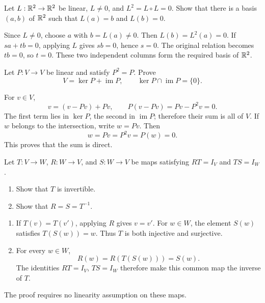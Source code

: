 \begin{problem}\label{ex:04:square-zero-map}
Let \(L:\mathbb R^2\to\mathbb R^2\) be linear, \(L\ne0\), and \(L^2=L\circ L=0\).
Show that there is a basis \((a,b)\) of \(\mathbb R^2\) such that
\(L(a)=b\) and \(L(b)=0\).
\end{problem}
\begin{solution}
Since \(L\ne0\), choose \(a\) with \(b=L(a)\ne0\).
Then \(L(b)=L^2(a)=0\).
If \(sa+tb=0\), applying \(L\) gives \(sb=0\), hence \(s=0\).
The original relation becomes \(tb=0\), so \(t=0\).
These two independent columns form the required basis of \(\mathbb R^2\).
\end{solution}

\begin{problem}\label{ex:04:idempotent}
Let \(P:V\to V\) be linear and satisfy \(P^2=P\).
Prove
\[
V=\ker P+\operatorname{im}P,\qquad
\ker P\cap\operatorname{im}P=\{0\}.
\]
\end{problem}
\begin{solution}
For \(v\in V\),
\[
v=(v-Pv)+Pv,\qquad P(v-Pv)=Pv-P^2v=0.
\]
The first term lies in \(\ker P\), the second in \(\operatorname{im}P\);
therefore their sum is all of \(V\).
If \(w\) belongs to the intersection, write \(w=Pv\). Then
\[
w=Pv=P^2v=P(w)=0.
\]
This proves that the sum is direct.
\end{solution}

\begin{problem}\label{ex:04:two-inverses}
Let \(T:V\to W\), \(R:W\to V\), and \(S:W\to V\) be maps satisfying
\(RT=I_V\) and \(TS=I_W\).
\begin{enumerate}
\item Show that \(T\) is invertible.
\item Show that \(R=S=T^{-1}\).
\end{enumerate}
\end{problem}
\begin{solution}
\begin{enumerate}
\item If \(T(v)=T(v')\), applying \(R\) gives \(v=v'\).
For \(w\in W\), the element \(S(w)\) satisfies \(T(S(w))=w\).
Thus \(T\) is both injective and surjective.
\item For every \(w\in W\),
\[
R(w)=R(T(S(w)))=S(w).
\]
The identities \(RT=I_V\), \(TS=I_W\) therefore make this common map
the inverse of \(T\).
\end{enumerate}
The proof requires no linearity assumption on these maps.
\end{solution}

